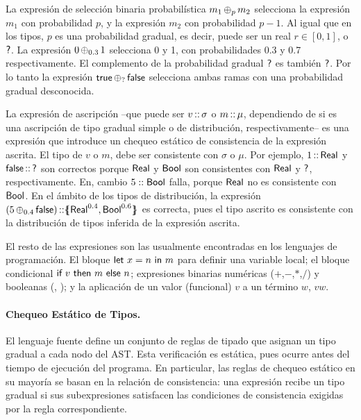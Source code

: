 La expresión de selección binaria probabilística $m_1 \mathop{\oplus_{p}} m_2$ selecciona la expresión $m_1$ con probabilidad $p$, y la expresión $m_2$ con probabilidad $p-1$. Al igual que en los tipos, $p$ es una probabilidad gradual, es decir, puede ser un real $r\in[0,1]$, o $\mathord{\text{\sffamily ?}}$. La expresión $0 \mathop{\oplus_{0.3}} 1$ selecciona 0 y 1, con probabilidades 0.3 y 0.7 respectivamente. El complemento de la probabilidad gradual $\mathord{\text{\sffamily ?}}$ es también $\mathord{\text{\sffamily ?}}$. Por lo tanto la expresión $\mathord{\text{\sffamily true}} \mathop{\oplus_{?}} \mathord{\text{\sffamily false}}$ selecciona ambas ramas con una probabilidad gradual desconocida.

La expresión de ascripción --que puede ser $v\mathop{\text{\sffamily ::}} \sigma$ o $m \mathop{\text{\sffamily ::}} \mu$, dependiendo de si es una ascripción de tipo gradual simple o de distribución, respectivamente-- es una expresión que introduce un chequeo estático de consistencia de la expresión ascrita. El tipo de $v$ o $m$, debe ser consistente con $\sigma$ o $\mu$. Por ejemplo, $1 \mathop{\text{\sffamily ::}} \mathord{\text{\sffamily Real}}$ y $\mathord{\text{\sffamily false}}\mathop{\text{\sffamily ::}}\mathord{\text{\sffamily ?}}$ son correctos porque $\mathord{\text{\sffamily Real}}$ y $\mathord{\text{\sffamily Bool}}$ son consistentes con $\mathord{\text{\sffamily Real}}$ y $\mathord{\text{\sffamily ?}}$, respectivamente. En, cambio $5 :: \mathord{\text{\sffamily Bool}}$ falla, porque $\mathord{\text{\sffamily Real}}$ no es consistente con $\mathord{\text{\sffamily Bool}}$. En el ámbito de los tipos de distribución, la expresión $(5 \mathop{\oplus_{0.4}} \mathord{\text{\sffamily false}}) \mathop{\text{\sffamily ::}} \{\mskip-7mu\{ {\mathord{\text{\sffamily Real}} ^ {0.4} , \mathord{\text{\sffamily Bool}} ^ {0.6}} \}\mskip-7mu\}$ es correcta, pues el tipo ascrito es consistente con la distribución de tipos inferida de la expresión ascrita.

El resto de las expresiones son las usualmente encontradas en los lenguajes de programación. El bloque $\text{\sffamily let } {x} = {n} \text{\sffamily { in }} {m}$ para definir una variable local;  el bloque condicional $\text{\sffamily {if }} {v} \text{\sffamily { then }} {m} \text{\sffamily { else }} {n}$; expresiones binarias numéricas ($+$,$-$,$*$,$/$) y booleanas (\andop, \orop); y la aplicación de un valor (funcional) $v$ a un término $w$, $vw$.


  \paragraph{Chequeo Estático de Tipos.}\label{par:lang-source-static} El lenguaje fuente define un conjunto de reglas de tipado que asignan un tipo gradual a cada nodo del AST. Esta verificación es estática, pues ocurre antes del tiempo de ejecución del programa. En particular, las reglas de chequeo estático en su mayoría se basan en la relación de consistencia: una expresión recibe un tipo gradual si sus subexpresiones satisfacen las condiciones de consistencia exigidas por la regla correspondiente.

  

